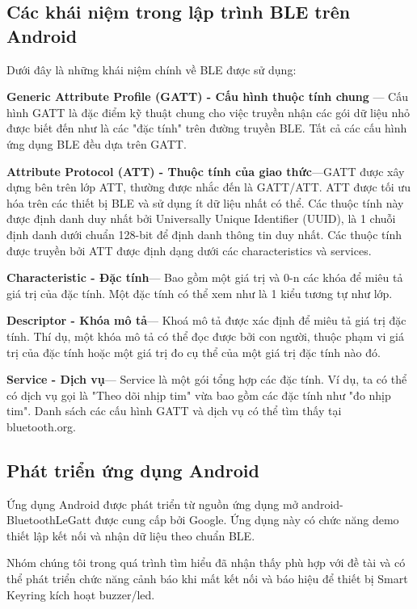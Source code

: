 \subsection{Các khái niệm trong lập trình BLE trên Android}
\label{sec: bleterm}
Dưới đây là những khái niệm chính về BLE được sử dụng: \cite{deva}

\textbf{Generic Attribute Profile (GATT) -  Cấu hình thuộc tính chung }— Cấu hình GATT là đặc điểm kỹ thuật chung cho việc truyền nhận các gói dữ liệu nhỏ được biết đến như là các "đặc tính" trên đường truyền BLE. Tất cả các cấu hình ứng dụng BLE đều dựa trên GATT.

\textbf{Attribute Protocol (ATT) - Thuộc tính của giao thức}—GATT được xây dựng bên trên lớp ATT, thường được nhắc đến là GATT/ATT. ATT được tối ưu hóa trên các thiết bị BLE và sử dụng ít dữ liệu nhất có thể. Các thuộc tính này được định danh duy nhất bởi Universally Unique Identifier (UUID), là 1 chuỗi định danh dưới chuẩn 128-bit để định danh thông tin duy nhất. Các thuộc tính được truyền bởi ATT được định dạng dưới các characteristics và services.

\textbf{Characteristic -  Đặc tính}— Bao gồm một giá trị và 0-n các khóa để miêu tả giá trị của đặc tính. Một đặc tính có thể xem như là 1 kiểu tương tự như lớp.

\textbf{Descriptor - Khóa mô tả}— Khoá mô tả được xác định để miêu tả giá trị đặc tính. Thí dụ, một khóa mô tả có thể đọc được bởi con người, thuộc phạm vi giá trị của đặc tính hoặc một giá trị đo cụ thể của một giá trị đặc tính nào đó.

\textbf{Service - Dịch vụ}— Service là một gói tổng hợp các đặc tính. Ví dụ, ta có thể có dịch vụ gọi là "Theo dõi nhịp tim" vừa bao gồm các đặc tính như "đo nhịp tim". Danh sách các cấu hình GATT và dịch vụ có thể tìm thấy tại bluetooth.org.

\subsection{Phát triển ứng dụng Android}
Ứng dụng Android được phát triển từ nguồn ứng dụng mở android-BluetoothLeGatt\cite{blegatt} được cung cấp bởi Google. Ứng dụng này có chức năng demo thiết lập kết nối và nhận dữ liệu theo chuẩn BLE.

Nhóm chúng tôi trong quá trình tìm hiểu đã nhận thấy phù hợp với đề tài và có thể phát triển chức năng cảnh báo khi mất kết nối và báo hiệu để thiết bị Smart Keyring kích hoạt buzzer/led.


